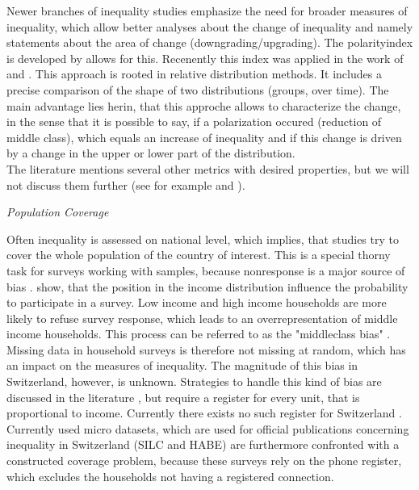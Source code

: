 \documentclass[twoside]{article}\usepackage[]{graphicx}\usepackage[]{color}
\begin{document}
\begin{multicols}{2}
Newer branches of inequality studies emphasize the need for broader measures of inequality, which allow better analyses about the change of inequality and namely statements about the area of change (downgrading/upgrading). The polarityindex is developed by \citep{Handock and Morris 1999} allows for this. Recenently this index was applied in the work of \citep{Alderson, Beckfield and Nielsen 2005 FEHLT} and \citep{Alderson and Doran 2013 FEHLT}. This approach is rooted in relative distribution methods. It includes a precise comparison of the shape of two distributions (groups, over time). The main advantage lies herin, that this approche allows to characterize the change, in the sense that it is possible to say, if a polarization occured (reduction of middle class), which equals an increase of inequality and if this change is driven by a change in the upper or lower part of the distribution.  \\
 
The literature mentions several other metrics with desired properties, but we will not discuss them further (see for example \citet{cowell_chapter_2000} and \citet{hao_assessing_2010}).



\emph{Population Coverage}
 
Often inequality is assessed on national level, which implies, that studies try to cover the whole population of the country of interest. This is a special thorny task for surveys working with samples, because nonresponse is a major source of bias \citep{bethlehem_handbook_2011}.  \citep{korinek_survey_2006} show, that the position in the income distribution influence the probability to participate in a survey. Low income and high income households are more likely to refuse survey response, which leads to an overrepresentation of middle income households. This process can be referred to as the "middleclass bias" \citep{diekmann_empirische_2009}. Missing data in household surveys is therefore not missing at random, which has an impact on the measures of inequality. The magnitude of this bias in Switzerland, however, is unknown. Strategies to handle this kind of bias are discussed in the literature \citep{S?rndal et al. 1992 FEHLT}, but require a register for every unit, that is proportional to income. Currently there exists no such register for Switzerland \citep{ecoplan 2014:43 FEHLT}. Currently used micro datasets, which are used for official publications concerning inequality in Switzerland (SILC and HABE) are furthermore confronted with a constructed coverage problem, because these surveys rely on the phone register, which excludes the households not having a registered connection. \\


\end{multicols}
\end{document}
